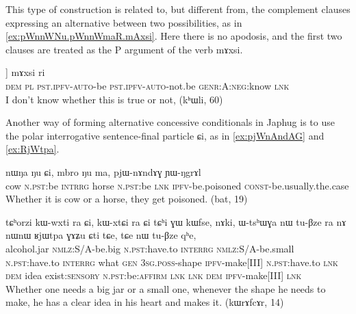 \documentclass[oldfontcommands,oneside,a4paper,11pt]{article}
\newcommand{\ipa}[1]{{\phon \mbox{#1}}} %
\begin{document}
This type of construction is related to, but different from, the complement clauses expressing an alternative between two possibilities, as in \ref{ex:pWnnWNu.pWnnWmaR.mAxsi}. Here there is no apodosis, and the first two clauses are treated as the P argument of the verb \ipa{mɤxsi}.

\begin{exe}
\ex  \label{ex:pWnnWNu.pWnnWmaR.mAxsi}
\gll
 [[\ipa{nɯ} \ipa{ra}  	 \ipa{pɯ-nnɯ-ŋu}]  	 [\ipa{pɯ-nnɯ-maʁ}]]   	\ipa{mɤxsi}  \ipa{ri}\\
\textsc{dem} \textsc{pl} \textsc{pst.ipfv-auto}-be \textsc{pst.ipfv-auto}-not.be \textsc{genr:A:neg}:know \textsc{lnk} \\
\glt I don't know whether this is true or not, (kʰɯli, 60)
\end{exe}

Another way of forming alternative concessive conditionals in Japhug is to use the polar interrogative sentence-final particle \ipa{ɕi}, as in \ref{ex:pjWnAndAG} and \ref{ex:RjWtpa}.
\begin{exe}
\ex  \label{ex:pjWnAndAG}
\gll
\ipa{nɯŋa}   	\ipa{ŋu}   	\ipa{ɕi,}   	\ipa{mbro}   	\ipa{ŋu}   	\ipa{ma,}   	\ipa{pjɯ-nɤndɤɣ}   	\ipa{ɲɯ-ŋgrɤl}   \\
cow \textsc{n.pst}:be \textsc{intrrg} horse  \textsc{n.pst}:be \textsc{lnk} \textsc{ipfv}-be.poisoned \textsc{const}-be.usually.the.case \\
\glt Whether it is cow or a horse, they get poisoned. (bat, 19)
\end{exe}

\begin{exe}
\ex  \label{ex:RjWtpa}
\gll
\ipa{tɕʰorzi}   	\ipa{kɯ-wxti}   	\ipa{ra}   	\ipa{ɕi,}   	\ipa{kɯ-xtɕi}   	\ipa{ra}   	\ipa{ɕi}   	\ipa{tɕʰi}   	\ipa{ɣɯ}   	\ipa{kɯfse,}   	\ipa{nɤki,}   	\ipa{ɯ-tsʰɯɣa}   	\ipa{nɯ}   	\ipa{tu-βze}   	\ipa{ra}   	\ipa{nɤ}   	\ipa{nɯnɯ}   	\ipa{ʁjɯtpa}   	\ipa{ɣɤʑu}   	\ipa{ɕti}   	\ipa{tɕe,}   	\ipa{tɕe}   	\ipa{nɯ}   	\ipa{tu-βze}   	\ipa{qʰe,}   \\
alcohol.jar \textsc{nmlz}:S/A-be.big \textsc{n.pst}:have.to \textsc{interrg} \textsc{nmlz}:S/A-be.small \textsc{n.pst}:have.to \textsc{interrg} what \textsc{gen} \textsc{3sg.poss}-shape \textsc{ipfv}-make[III]  \textsc{n.pst}:have.to \textsc{lnk} \textsc{dem} idea
exist:\textsc{sensory} \textsc{n.pst}:be:\textsc{affirm} \textsc{lnk} \textsc{lnk} \textsc{dem} \textsc{ipfv}-make[III]  \textsc{lnk} \\
\glt Whether one needs a big jar or a small one, whenever the shape he needs to make, he has a clear idea in his heart and makes it. (kɯrɤfcɤr, 14)
\end{exe}
\end{document}
